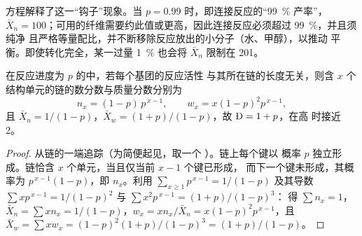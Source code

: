 方程解释了这一“钩子”现象。当 $p = 0.99$ 时，即连接反应的“99~\% 产率”，$\bar X_n =
100$；可用的纤维需要约此值或更高，因此连接反应必须超过 99~\%，并且须纯净
且严格等量配比，并不断移除反应放出的小分子（水、甲醇），以推动
平衡。即使转化完全，某一过量 1~\% 也会将 $\bar X_n$ 限制在 201。

\begin{theorem}[弗洛里分布]\label{thm:b2:polymer-synthesis:flory}
在反应进度为 $p$ 的中，若每个基团的反应活性
与其所在链的长度无关，则含 $x$ 个结构单元的链的数分数与质量分数分别为
\begin{equation*}
n_x = (1-p)\,p^{\,x-1}, \qquad w_x = x(1-p)^2 p^{\,x-1},
\end{equation*}
且 $\bar X_n = 1/(1-p)$，$\bar X_w = (1+p)/(1-p)$，故 $\text{\DH} = 1 + p$，在高
时接近 2。
\end{theorem}

\begin{proof}
从链的一端追踪（为简便起见，取一个  ）。链上每个键以
概率 $p$ 独立形成。链恰含 $x$ 个单元，当且仅当前 $x-1$ 个键已形成，
而下一个键未形成，其概率为 $p^{\,x-1}(1-p)$，即 $n_x$。利用 $\sum_{x\ge1} p^{\,x-1} =
1/(1-p)$ 及其导数 $\sum x p^{\,x-1} = 1/(1-p)^2$ 与 $\sum x^2 p^{\,x-1} = (1+p)/(1-p)^3$：
得 $\sum n_x = 1$，$\bar X_n = \sum x n_x = 1/(1-p)$，$w_x = x n_x/\bar X_n = x(1-p)^2p^{\,x-1}$，且
$\bar X_w = \sum x w_x = (1-p)^2(1+p)/(1-p)^3 = (1+p)/(1-p)$。
\end{proof}

